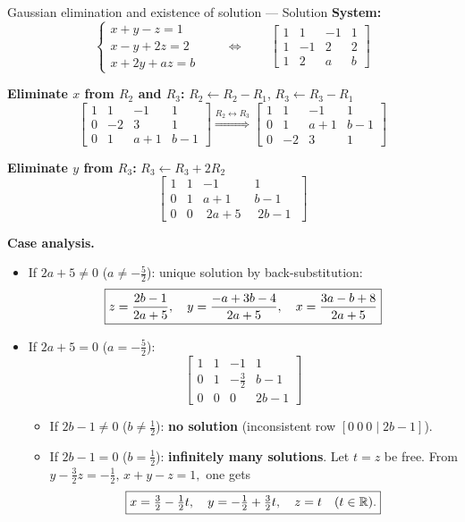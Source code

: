 \documentclass[9pt]{beamer}
\begin{document}
\begin{frame}{Gaussian elimination and existence of solution — Solution}
\tiny
\textbf{System:}
\[
\begin{cases}
x+y-z=1\\
x-y+2z=2\\
x+2y+az=b
\end{cases}
\qquad\Longleftrightarrow\qquad
\left[\begin{array}{ccc|c}
1&1&-1&1\\
1&-1&2&2\\
1&2&a&b
\end{array}\right]
\]

\textbf{Eliminate $x$ from $R_2$ and $R_3$:} $R_2\leftarrow R_2-R_1$, $R_3\leftarrow R_3-R_1$
\[
\left[\begin{array}{ccc|c}
1&1&-1&1\\
0&-2&3&1\\
0&1&a+1&b-1
\end{array}\right]
\overset{R_2\leftrightarrow R_3}{\Longrightarrow}
\left[\begin{array}{ccc|c}
1&1&-1&1\\
0&1&a+1&b-1\\
0&-2&3&1
\end{array}\right]
\]

\textbf{Eliminate $y$ from $R_3$:} $R_3\leftarrow R_3+2R_2$
\[
\left[\begin{array}{ccc|c}
1&1&-1&1\\
0&1&a+1&b-1\\
0&0&\;2a+5\;&\;2b-1\;
\end{array}\right]
\]

\textbf{Case analysis.}
\begin{itemize}
\item If $2a+5\neq 0$ ($a\neq -\tfrac{5}{2}$): unique solution by back-substitution:
\[
\boxed{%
z=\frac{2b-1}{2a+5},\quad
y=\frac{-a+3b-4}{2a+5},\quad
x=\frac{3a-b+8}{2a+5}}
\]
\item If $2a+5=0$ ($a=-\tfrac{5}{2}$):
\[
\left[\begin{array}{ccc|c}
1&1&-1&1\\
0&1&-\tfrac{3}{2}&b-1\\
0&0&0&2b-1
\end{array}\right]
\]
\begin{itemize}
\item If $2b-1\neq 0$ ($b\neq \tfrac{1}{2}$): \textbf{no solution} (inconsistent row $[0\ 0\ 0\mid 2b-1]$).
\item If $2b-1=0$ ($b=\tfrac{1}{2}$): \textbf{infinitely many solutions}. Let $t=z$ be free. From
$
y-\tfrac{3}{2}z=-\tfrac{1}{2},\, x+y-z=1,
$
one gets
\[
\boxed{%
x=\tfrac{3}{2}-\tfrac{1}{2}t,\quad
y=-\tfrac{1}{2}+\tfrac{3}{2}t,\quad
z=t \quad (t\in\mathbb{R}).}
\]
\end{itemize}
\end{itemize}
\end{frame}
\end{document}
